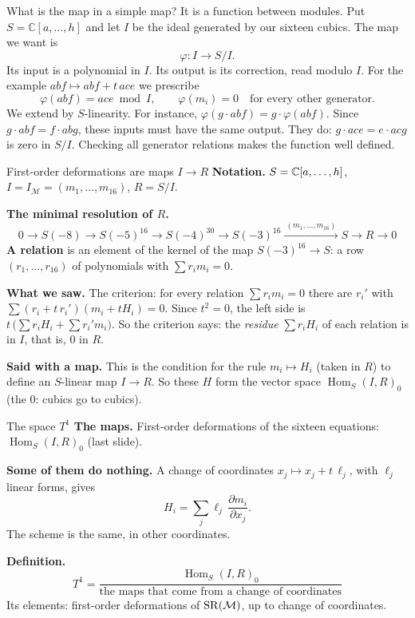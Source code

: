 \begin{frame}{What is the map in a simple map?}
It is a function between modules. Put \(S=\mathbb C[a,\ldots,h]\)
and let \(I\) be the ideal generated by our sixteen cubics.
The map we want is
\[
\varphi:I\longrightarrow S/I.
\]
Its input is a polynomial in \(I\). Its output is its correction,
read modulo \(I\). For the example \(abf\mapsto abf+t\,ace\) we prescribe
\[
\varphi(abf)=ace\bmod I,\qquad
\varphi(m_i)=0\quad\text{for every other generator}.
\]
We extend by \(S\)-linearity. For instance,
\(\varphi(g\cdot abf)=g\cdot\varphi(abf)\).
Since \(g\cdot abf=f\cdot abg\), these inputs must have the same
output. They do: \(g\cdot ace=e\cdot acg\) is zero in \(S/I\).
Checking all generator relations makes the function well defined.
\end{frame}

\begin{frame}{First-order deformations are maps \(I\to R\)}
\textbf{Notation.} \(S=\mathbb C[a,\dots,h]\), \(I=I_{\mathcal M}=(m_1,\dots,m_{16})\), \(R=S/I\).
\par
\textbf{The minimal resolution of \(R\).}
\[
0\longrightarrow S(-8)\longrightarrow S(-5)^{16}\longrightarrow S(-4)^{30}\longrightarrow S(-3)^{16}\xrightarrow{\ (m_1,\dots,m_{16})\ }S\longrightarrow R\longrightarrow0
\]
\textbf{A relation} is an element of the kernel of the map \(S(-3)^{16}\to S\): a row \((r_1,\dots,r_{16})\) of polynomials with \(\sum r_im_i=0\).
\par
\textbf{What we saw.} The criterion: for every relation \(\sum r_im_i=0\) there are \(r_i'\) with \(\sum(r_i+t\,r_i')(m_i+tH_i)=0\). Since \(t^2=0\), the left side is \(t\,\bigl(\sum r_iH_i+\sum r_i'm_i\bigr)\). So the criterion says: the \emph{residue} \(\sum r_iH_i\) of each relation is in \(I\), that is, \(0\) in \(R\).
\par
\textbf{Said with a map.} This is the condition for the rule \(m_i\mapsto H_i\) (taken in \(R\)) to define an \(S\)-linear map \(I\to R\). So these \(H\) form the vector space \(\operatorname{Hom}_S(I,R)_0\) (the \(0\): cubics go to cubics).
\end{frame}

\begin{frame}{The space \(T^1\)}
\textbf{The maps.} First-order deformations of the sixteen equations: \(\operatorname{Hom}_S(I,R)_0\) (last slide).
\par\medskip
\textbf{Some of them do nothing.} A change of coordinates \(x_j\mapsto x_j+t\,\ell_j\), with \(\ell_j\) linear forms, gives
\[
H_i=\sum_j\ell_j\,\frac{\partial m_i}{\partial x_j}.
\]
The scheme is the same, in other coordinates.
\par\medskip
\textbf{Definition.}
\[
\boxed{T^1=\frac{\operatorname{Hom}_S(I,R)_0}{\text{the maps that come from a change of coordinates}}}
\]
Its elements: first-order deformations of \(\operatorname{SR}(\mathcal M)\), up to change of coordinates.
\end{frame}

